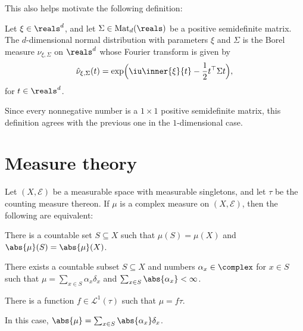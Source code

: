 \documentclass[article, a4paper, 11pt, oneside]{memoir}
\numberwithin{equation}{chapter}
\newcommand{\calE}{\mathcal{E}}
\newcommand{\calL}{\mathcal{L}}
\begin{document}

This also helps motivate the following definition:

\begin{definition}
    Let $\xi \in \reals^d$, and let $\Sigma \in \mathrm{Mat}_d(\reals)$ be a positive semidefinite matrix. The $d$-dimensional normal distribution with parameters $\xi$ and $\Sigma$ is the Borel measure $\nu_{\xi,\Sigma}$ on $\reals^d$ whose Fourier transform is given by
    \begin{equation*}
        \hat{\nu}_{\xi,\Sigma}(t)
            = \exp \Bigl( \iu \inner{\xi}{t} - \frac{1}{2} t\trans \Sigma t \Bigr),
    \end{equation*}
    for $t \in \reals^d$.
\end{definition}
%
Since every nonnegative number is a $1 \times 1$ positive semidefinite matrix, this definition agrees with the previous one in the $1$-dimensional case.


\chapter{Measure theory}



\begin{proposition}
    Let $(X,\calE)$ be a measurable space with measurable singletons, and let $\tau$ be the counting measure thereon. If $\mu$ is a complex measure on $(X,\calE)$, then the following are equivalent:
    \begin{enumprop}
        \item There is a countable set $S \subseteq X$ such that $\mu(S) = \mu(X)$ and $\abs{\mu}(S) = \abs{\mu}(X)$.
        
        \item There exists a countable subset $S \subseteq X$ and numbers $\alpha_x \in \complex$ for $x \in S$ such that $\mu = \sum_{x \in S} \alpha_x \delta_x$ and $\sum_{x \in S} \abs{\alpha_x} < \infty$.
        
        \item There is a function $f \in \calL^1(\tau)$ such that $\mu = f \tau$.
    \end{enumprop}
    In this case, $\abs{\mu} = \sum_{x \in S} \abs{\alpha_x} \delta_x$.
\end{proposition}
\end{document}
